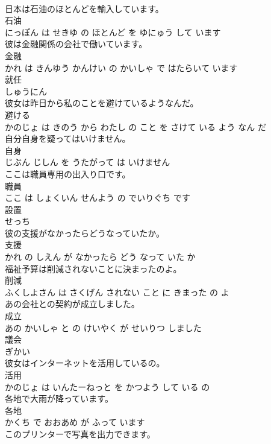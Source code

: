 \documentclass[8pt]{extreport}
\begin{document}
\begin{CJK}{UTF8}{min}
\\	日本は石油のほとんどを輸入しています。	
\\	石油 
\\	にっぽん は せきゆ の ほとんど を ゆにゅう して います			
\\	彼は金融関係の会社で働いています。	
\\	金融 
\\	かれ は きんゆう かんけい の かいしゃ で はたらいて います			
\\	就任	
\\	しゅうにん			
\\	彼女は昨日から私のことを避けているようなんだ。	
\\	避ける 
\\	かのじょ は きのう から わたし の こと を さけて いる よう なん だ			
\\	自分自身を疑ってはいけません。	
\\	自身 
\\	じぶん じしん を うたがって は いけません			
\\	ここは職員専用の出入り口です。	
\\	職員 
\\	ここ は しょくいん せんよう の でいりぐち です			
\\	設置	
\\	せっち			
\\	彼の支援がなかったらどうなっていたか。	
\\	支援 
\\	かれ の しえん が なかったら どう なって いた か			
\\	福祉予算は削減されないことに決まったのよ。	
\\	削減 
\\	ふくしよさん は さくげん されない こと に きまった の よ			
\\	あの会社との契約が成立しました。	
\\	成立 
\\	あの かいしゃ と の けいやく が せいりつ しました			
\\	議会	
\\	ぎかい			
\\	彼女はインターネットを活用しているの。	
\\	活用 
\\	かのじょ は いんたーねっと を かつよう して いる の			
\\	各地で大雨が降っています。	
\\	各地 
\\	かくち で おおあめ が ふって います			
\\	このプリンターで写真を出力できます。	

\end{CJK}
\end{document}
